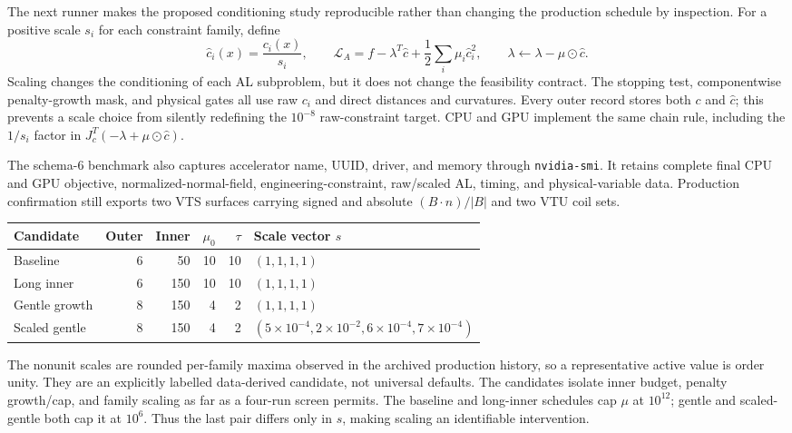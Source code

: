 \documentclass[11pt,a4paper]{article}
\newcommand{\code}[1]{\texttt{#1}}
\begin{document}
The next runner makes the proposed conditioning study reproducible rather than
changing the production schedule by inspection.  For a positive scale $s_i$
for each constraint family, define
\begin{equation}
  \widehat c_i(x)=\frac{c_i(x)}{s_i},\qquad
  \mathcal L_A=f-\lambda^T\widehat c
    +\frac12\sum_i\mu_i\widehat c_i^2,
  \qquad
  \lambda\leftarrow\lambda-\mu\odot\widehat c.
  \label{eq:scaled-equality-zero-al}
\end{equation}
Scaling changes the conditioning of each AL subproblem, but it does not change
the feasibility contract.  The stopping test, componentwise penalty-growth
mask, and physical gates all use raw $c_i$ and direct distances and
curvatures.  Every outer record stores both $c$ and $\widehat c$; this prevents
a scale choice from silently redefining the $10^{-8}$ raw-constraint target.
CPU and GPU implement the same chain rule, including the $1/s_i$ factor in
$J_c^T(-\lambda+\mu\odot\widehat c)$.

The schema-6 benchmark also captures accelerator name, UUID, driver, and memory
through \code{nvidia-smi}.  It retains complete final CPU and GPU objective,
normalized-normal-field, engineering-constraint, raw/scaled AL, timing, and
physical-variable data.  Production confirmation still exports two VTS
surfaces carrying signed and absolute $(B\cdot n)/|B|$ and two VTU coil sets.

\begin{center}
\begin{tabular}{lrrrrl}
\toprule
Candidate & Outer & Inner & $\mu_0$ & $\tau$ & Scale vector $s$ \\
\midrule
Baseline & 6 & 50 & 10 & 10 & $(1,1,1,1)$ \\
Long inner & 6 & 150 & 10 & 10 & $(1,1,1,1)$ \\
Gentle growth & 8 & 150 & 4 & 2 & $(1,1,1,1)$ \\
Scaled gentle & 8 & 150 & 4 & 2 &
$(5\!\times\!10^{-4},2\!\times\!10^{-2},6\!\times\!10^{-4},7\!\times\!10^{-4})$ \\
\bottomrule
\end{tabular}
\end{center}
The nonunit scales are rounded per-family maxima observed in the archived
production history, so a representative active value is order unity.  They
are an explicitly labelled data-derived candidate, not universal defaults.
The candidates isolate inner budget, penalty growth/cap, and family scaling as
far as a four-run screen permits.  The baseline and long-inner schedules cap
$\mu$ at $10^{12}$; gentle and scaled-gentle both cap it at $10^6$.  Thus the
last pair differs only in $s$, making scaling an identifiable intervention.
\end{document}
